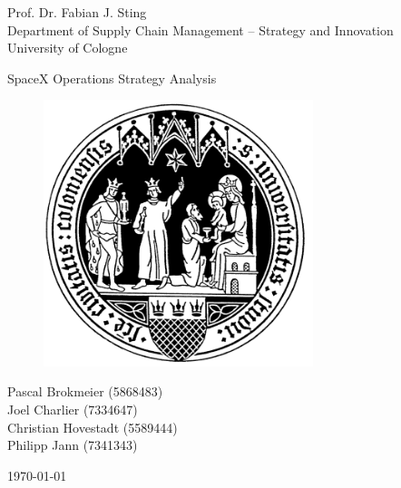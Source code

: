 \documentclass[11pt,a4paper]{article}
\begin{document}
\begin{titlepage}
\setlength{\parindent}{0pt} %
\begin{center}

\small{Prof. Dr. Fabian J. Sting \\
Department of Supply Chain Management – Strategy and Innovation \\
University of Cologne\\}
\vspace{20mm}

\Huge{SpaceX Operations Strategy Analysis}

\vspace{10mm}
\begin{figure}[!h]
    \centering
    \includegraphics[width=0.7\textwidth]{siegel.png}
\end{figure}

\vspace{10mm}

\small{
Pascal Brokmeier (5868483) \\
Joel Charlier (7334647) \\
Christian Hovestadt (5589444) \\
Philipp Jann (7341343) \\
}

\vspace{10mm}
\today
{}
\end{center}
\end{titlepage}

\newpage
{}
\end{document}
